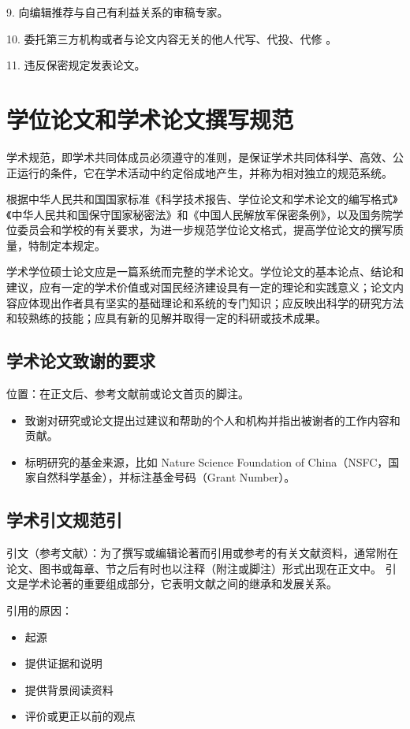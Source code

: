 \documentclass[12pt,hyperref,a4paper,UTF8]{ctexart}
\begin{document}
9.
向编辑推荐与自己有利益关系的审稿专家。

10.
委托第三方机构或者与论文内容无关的他人代写、代投、代修 。

11.
违反保密规定发表论文。


\section{学位论文和学术论文撰写规范}

学术规范，即学术共同体成员必须遵守的准则，是保证学术共同体科学、高效、公正运行的条件，它在学术活动中约定俗成地产生，并称为相对独立的规范系统。

根据中华人民共和国国家标准《科学技术报告、学位论文和学术论文的编写格式》《中华人民共和国保守国家秘密法》和《中国人民解放军保密条例》，以及国务院学位委员会和学校的有关要求，为进一步规范学位论文格式，提高学位论文的撰写质量，特制定本规定。

学术学位硕士论文应是一篇系统而完整的学术论文。学位论文的基本论点、结论和建议，应有一定的学术价值或对国民经济建设具有一定的理论和实践意义；论文内容应体现出作者具有坚实的基础理论和系统的专门知识；应反映出科学的研究方法和较熟练的技能；应具有新的见解并取得一定的科研或技术成果。

\subsection{学术论文致谢的要求}
位置：在正文后、参考文献前或论文首页的脚注。

\begin{itemize}
	\item 致谢对研究或论文提出过建议和帮助的个人和机构并指出被谢者的工作内容和贡献。
	\item 标明研究的基金来源，比如 Nature Science Foundation of China（NSFC，国家自然科学基金），并标注基金号码（Grant Number）。
\end{itemize}

\subsection{学术引文规范引}

引文（参考文献）：为了撰写或编辑论著而引用或参考的有关文献资料，通常附在论文、图书或每章、节之后有时也以注释（附注或脚注）形式出现在正文中。
引文是学术论著的重要组成部分，它表明文献之间的继承和发展关系。

引用的原因：
\begin{itemize}
	\item 起源
	\item 提供证据和说明
	\item 提供背景阅读资料
	\item 评价或更正以前的观点
\end{itemize}
\end{document}
